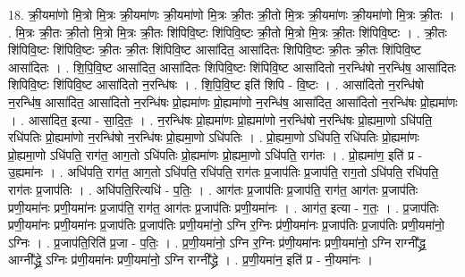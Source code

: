 \documentclass[17pt]{extarticle}
\begin{document}
18. क्री॒यमा॑णो मि॒त्रो मि॒त्रः क्री॒यमा॑णः क्री॒यमा॑णो मि॒त्रः क्री॒तः क्री॒तो मि॒त्रः क्री॒यमा॑णः क्री॒यमा॑णो मि॒त्रः क्री॒तः । . मि॒त्रः क्री॒तः क्री॒तो मि॒त्रो मि॒त्रः क्री॒तः शि॑पिवि॒ष्टः शि॑पिवि॒ष्टः क्री॒तो मि॒त्रो मि॒त्रः क्री॒तः शि॑पिवि॒ष्टः । . क्री॒तः शि॑पिवि॒ष्टः शि॑पिवि॒ष्टः क्री॒तः क्री॒तः शि॑पिवि॒ष्ट आसा॑दित॒ आसा॑दितः शिपिवि॒ष्टः क्री॒तः क्री॒तः शि॑पिवि॒ष्ट आसा॑दितः । . शि॒पि॒वि॒ष्ट आसा॑दित॒ आसा॑दितः शिपिवि॒ष्टः शि॑पिवि॒ष्ट आसा॑दितो न॒रन्धि॑षो न॒रन्धि॑ष॒ आसा॑दितः शिपिवि॒ष्टः शि॑पिवि॒ष्ट आसा॑दितो न॒रन्धि॑षः । . शि॒पि॒वि॒ष्ट इति॑ शिपि - वि॒ष्टः । . आसा॑दितो न॒रन्धि॑षो न॒रन्धि॑ष॒ आसा॑दित॒ आसा॑दितो न॒रन्धि॑षः प्रो॒ह्यमा॑णः प्रो॒ह्यमा॑णो न॒रन्धि॑ष॒ आसा॑दित॒ आसा॑दितो न॒रन्धि॑षः प्रो॒ह्यमा॑णः । . आसा॑दित॒ इत्या - सा॒दि॒तः॒ । . न॒रन्धि॑षः प्रो॒ह्यमा॑णः प्रो॒ह्यमा॑णो न॒रन्धि॑षो न॒रन्धि॑षः प्रो॒ह्यमा॒णो ऽधि॑पति॒ रधि॑पतिः प्रो॒ह्यमा॑णो न॒रन्धि॑षो न॒रन्धि॑षः प्रो॒ह्यमा॒णो ऽधि॑पतिः । . प्रो॒ह्यमा॒णो ऽधि॑पति॒ रधि॑पतिः प्रो॒ह्यमा॑णः प्रो॒ह्यमा॒णो ऽधि॑पति॒ राग॑त॒ आग॒तो ऽधि॑पतिः प्रो॒ह्यमा॑णः प्रो॒ह्यमा॒णो ऽधि॑पति॒ राग॑तः । . प्रो॒ह्यमा॑ण॒ इति॑ प्र - उ॒ह्यमा॑नः । . अधि॑पति॒ राग॑त॒ आग॒तो ऽधि॑पति॒ रधि॑पति॒ राग॑तः प्र॒जाप॑तिः प्र॒जाप॑ति॒ राग॒तो ऽधि॑पति॒ रधि॑पति॒ राग॑तः प्र॒जाप॑तिः । . अधि॑पति॒रित्यधि॑ - प॒तिः॒ । . आग॑तः प्र॒जाप॑तिः प्र॒जाप॑ति॒ राग॑त॒ आग॑तः प्र॒जाप॑तिः प्रणी॒यमा॑नः प्रणी॒यमा॑नः प्र॒जाप॑ति॒ राग॑त॒ आग॑तः प्र॒जाप॑तिः प्रणी॒यमा॑नः । . आग॑त॒ इत्या - ग॒तः॒ । . प्र॒जाप॑तिः प्रणी॒यमा॑नः प्रणी॒यमा॑नः प्र॒जाप॑तिः प्र॒जाप॑तिः प्रणी॒यमा॑नो॒ ऽग्नि र॒ग्निः प्र॑णी॒यमा॑नः प्र॒जाप॑तिः प्र॒जाप॑तिः प्रणी॒यमा॑नो॒ ऽग्निः । . प्र॒जाप॑ति॒रिति॑ प्र॒जा - प॒तिः॒ । . प्र॒णी॒यमा॑नो॒ ऽग्नि र॒ग्निः प्र॑णी॒यमा॑नः प्रणी॒यमा॑नो॒ ऽग्नि राग्नी᳚द्ध्र॒ आग्नी᳚द्ध्रे॒ ऽग्निः प्र॑णी॒यमा॑नः प्रणी॒यमा॑नो॒ ऽग्नि राग्नी᳚द्ध्रे । . प्र॒णी॒यमा॑न॒ इति॑ प्र - नी॒यमा॑नः । \newline
\end{document}
